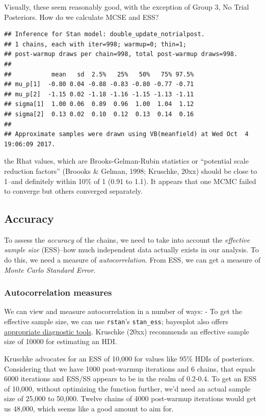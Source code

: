 \documentclass[]{article}
\begin{document}
Visually, these seem reasonably good, with the exception of Group 3, No
Trial Posteriors. How do we calculate MCSE and ESS?

\begin{verbatim}
## Inference for Stan model: double_update_notrialpost.
## 1 chains, each with iter=998; warmup=0; thin=1; 
## post-warmup draws per chain=998, total post-warmup draws=998.
## 
##           mean   sd  2.5%   25%   50%   75% 97.5%
## mu_p[1]  -0.80 0.04 -0.88 -0.83 -0.80 -0.77 -0.71
## mu_p[2]  -1.15 0.02 -1.18 -1.16 -1.15 -1.13 -1.11
## sigma[1]  1.00 0.06  0.89  0.96  1.00  1.04  1.12
## sigma[2]  0.13 0.02  0.10  0.12  0.13  0.14  0.16
## 
## Approximate samples were drawn using VB(meanfield) at Wed Oct  4 19:06:09 2017.
\end{verbatim}

the Rhat values, which are Brooks-Gelman-Rubin statistics or ``potential
scale reduction factors'' (Broooks \& Gelman, 1998; Kruschke, 20xx)
should be close to 1--and definitely within 10\% of 1 (0.91 to 1.1). It
appears that one MCMC failed to converge but others converged
separately.

\subsection{Accuracy}\label{accuracy}

To assess the \emph{accuracy} of the chains, we need to take into
account the \emph{effective sample size} (ESS)--how much independent
data actually exists in our analysis. To do this, we need a measure of
\emph{autocorrelation}. From ESS, we can get a measure of \emph{Monte
Carlo Standard Error}.

\subsubsection{Autocorrelation measures}\label{autocorrelation-measures}

We can view and measure autocorrelation in a number of ways: - To get
the effective sample size, we can use \texttt{rstan}'s
\texttt{stan\_ess}; bayesplot also offers
\href{\%5Bhttps://cran.r-project.org/web/packages/bayesplot/vignettes/visual-mcmc-diagnostics.html\#effective-sample-size}{appropriate
diagnostic tools}. Kruschke (20xx) recommends an effective sample size
of 10000 for estimating an HDI.

Kruschke advocates for an ESS of 10,000 for values like 95\% HDIs of
posteriors. Considering that we have 1000 post-warmup iterations and 6
chains, that equals 6000 iterations and ESS/SS appears to be in the
realm of 0.2-0.4. To get an ESS of 10,000, without optimizing the
function further, we'd need an actual sample size of 25,000 to 50,000.
Twelve chains of 4000 post-warmup iterations would get us 48,000, which
seems like a good amount to aim for.
\end{document}

